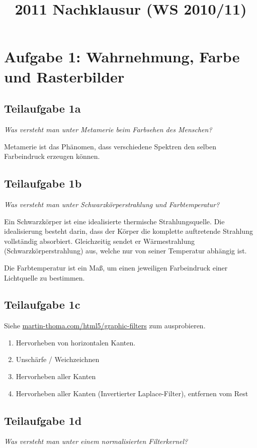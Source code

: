 \documentclass[a4paper]{scrartcl}
\begin{document}
\title{2011 Nachklausur (WS 2010/11)}

\setcounter{section}{1}
\section*{Aufgabe 1: Wahrnehmung, Farbe und Rasterbilder}
\subsection*{Teilaufgabe 1a}
\textit{Was versteht man unter Metamerie beim Farbsehen des Menschen?}

Metamerie ist das Phänomen, dass verschiedene Spektren den selben Farbeindruck
erzeugen können.

\subsection*{Teilaufgabe 1b}
\textit{Was versteht man unter Schwarzkörperstrahlung und Farbtemperatur?}

Ein Schwarzkörper ist eine idealisierte thermische Strahlungsquelle. Die
idealisierung besteht darin, dass der Körper die komplette auftretende
Strahlung vollständig absorbiert. Gleichzeitig sendet er Wärmestrahlung
(Schwarzkörperstrahlung) aus, welche nur von seiner Temperatur abhängig ist.

Die Farbtemperatur ist ein Maß, um einen jeweiligen Farbeindruck einer
Lichtquelle zu bestimmen.

\subsection*{Teilaufgabe 1c}
Siehe \href{https://martin-thoma.com/html5/graphic-filters/graphic-filters.htm}{martin-thoma.com/html5/graphic-filters} zum ausprobieren.

\begin{enumerate}[label=(\Alph*)]
    \item Hervorheben von horizontalen Kanten.
    \item Unschärfe / Weichzeichnen
    \item Hervorheben aller Kanten
    \item Hervorheben aller Kanten (Invertierter Laplace-Filter), entfernen vom
          Rest
\end{enumerate}

\subsection*{Teilaufgabe 1d}
\textit{Was versteht man unter einem normalisierten Filterkernel?}
\end{document}
